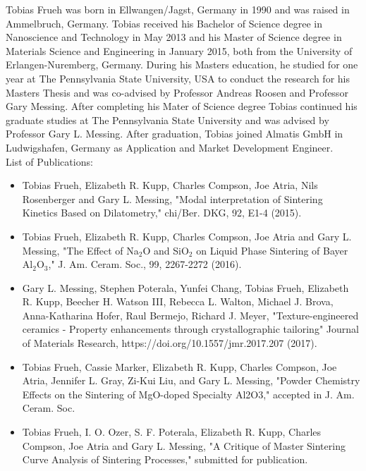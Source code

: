 Tobias Frueh was born in Ellwangen/Jagst, Germany in 1990 and was raised in Ammelbruch, Germany. Tobias received his Bachelor of Science degree in Nanoscience and Technology in May 2013 and his Master of Science degree in Materials Science and Engineering in January 2015, both from the University of Erlangen-Nuremberg, Germany. During his Masters education, he studied for one year at The Pennsylvania State University, USA to conduct the research for his Masters Thesis and was co-advised by Professor Andreas Roosen and Professor Gary Messing. After completing his Mater of Science degree Tobias continued his graduate studies at The Pennsylvania State University and was advised by Professor Gary L. Messing. After graduation, Tobias joined Almatis GmbH in Ludwigshafen, Germany as Application and Market Development Engineer.
\\
\newline
\noindent List of Publications:
\begin{itemize}
	\item Tobias Frueh, Elizabeth R. Kupp, Charles Compson, Joe Atria, Nils Rosenberger and Gary L. Messing, "Modal interpretation of Sintering Kinetics Based on Dilatometry," chi/Ber. DKG, 92, E1-4 (2015). 
	\item Tobias Frueh, Elizabeth R. Kupp, Charles Compson, Joe Atria and Gary L. Messing, "The Effect of Na$_{2}$O and SiO$_{2}$ on Liquid Phase Sintering of Bayer Al$_{2}$O$_{3}$," J. Am. Ceram. Soc., 99, 2267-2272 (2016).
	\item Gary L. Messing, Stephen Poterala, Yunfei Chang, Tobias Frueh, Elizabeth R. Kupp, Beecher H. Watson III, Rebecca L. Walton, Michael J. Brova, Anna-Katharina Hofer, Raul Bermejo, Richard J. Meyer, "Texture-engineered ceramics - Property enhancements through crystallographic tailoring" Journal of Materials Research, https://doi.org/10.1557/jmr.2017.207 (2017).
	\item Tobias Frueh, Cassie Marker, Elizabeth R. Kupp, Charles Compson, Joe Atria, Jennifer L. Gray, Zi-Kui Liu, and Gary L. Messing, "Powder Chemistry Effects on the Sintering of MgO-doped Specialty Al2O3," accepted in J. Am. Ceram. Soc.
	\item Tobias Frueh, I. O. Ozer, S. F. Poterala, Elizabeth R. Kupp, Charles Compson, Joe Atria and Gary L. Messing, "A Critique of Master Sintering Curve Analysis of Sintering Processes," submitted for publication.
\end{itemize}